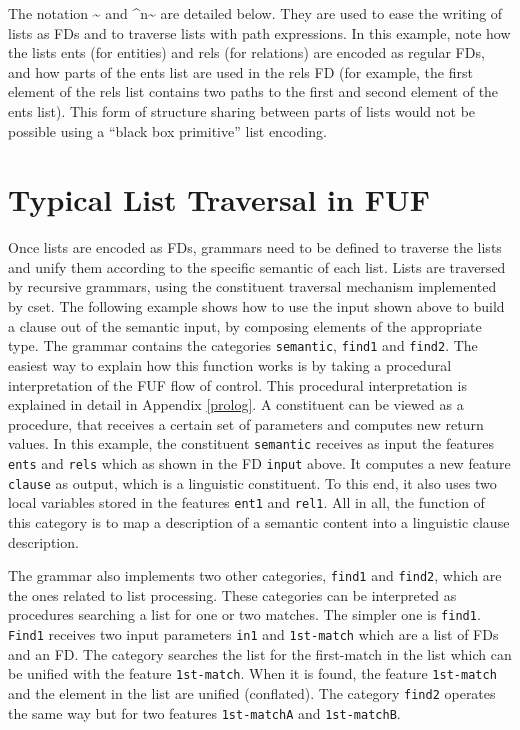 \documentclass[10pt,a4paper]{report}
\begin{document}
The notation \~{} and \^{}n\~{} are detailed below.  They are used to ease the
writing of lists as FDs and to traverse lists with path expressions.  
In this example, note how the lists ents (for entities) and rels (for
relations) are encoded as regular FDs, and how parts of the ents list are
used in the rels FD (for example, the first element of the rels list
contains two paths to the first and second element of the ents list).  This
form of structure sharing between parts of lists would not be possible
using a ``black box primitive'' list encoding.


\section{Typical List Traversal in FUF}

Once lists are encoded as FDs, grammars need to be defined to traverse the
lists and unify them according to the specific semantic of each list.
Lists are traversed by recursive grammars, using the constituent traversal
mechanism implemented by cset.  The following example shows how to use the
input shown above to build a clause out of the semantic input, by composing
elements of the appropriate type.  The grammar contains the categories
{\tt semantic}, {\tt find1} and {\tt find2}.  The easiest way to explain how this
function works is by taking a procedural interpretation of the FUF flow of
control.  This procedural interpretation is explained in detail in Appendix
\ref{prolog}.  A constituent can be viewed as a procedure, that receives a
certain set of parameters and computes new return values.  In this example,
the constituent {\tt semantic} receives as input the features {\tt ents} and
{\tt rels} which as shown in the FD {\tt input} above.  It computes a new
feature {\tt clause} as output, which is a linguistic constituent.  To this
end, it also uses two local variables stored in the features {\tt ent1} and
{\tt rel1}.  All in all, the function of this category is to map a
description of a semantic content into a linguistic clause description.  

The grammar also implements two other categories, {\tt find1} and {\tt find2},
which are the ones related to list processing.  These categories can be
interpreted as procedures searching a list for one or two matches.  The
simpler one is {\tt find1}.  {\tt Find1} receives two input parameters {\tt in1}
and {\tt 1st-match} which are a list of FDs and an FD.  The category searches
the list for the first-match in the list which can be unified with the
feature {\tt 1st-match}.  When it is found, the feature {\tt 1st-match} and the
element in the list are unified (conflated).  The category {\tt find2}
operates the same way but for two features {\tt 1st-matchA} and
{\tt 1st-matchB}.  
\end{document}
